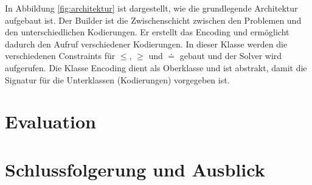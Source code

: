 \documentclass[a4,abstract=on]{scrartcl}
\newcommand*\stdsection{}
\let\stdsection\section
\renewcommand*\section{%
    \clearpage\ifodd\value{page}\else\mbox{}\clearpage\fi
    \stdsection}
\begin{document}
In Abbildung \ref{fig:architektur} ist dargestellt, wie die grundlegende Architektur aufgebaut ist. 
Der Builder ist die Zwischenschicht zwischen den Problemen und den unterschiedlichen Kodierungen. Er erstellt das Encoding und ermöglicht dadurch den Aufruf verschiedener Kodierungen. In dieser Klasse werden die verschiedenen Constraints für $\leq$, 	$\geq$ und $\doteq$ gebaut und der Solver wird aufgerufen. Die Klasse Encoding dient als Oberklasse und ist abstrakt, damit die Signatur für die Unterklassen (Kodierungen) vorgegeben ist. 

\section{Evaluation}

\section{Schlussfolgerung und Ausblick}




\end{document}
